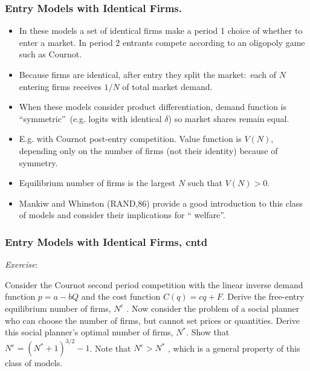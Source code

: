 \begin{frame}%

\frametitle{Entry Models with Identical Firms.}

\begin{itemize}
\item In these models a set of identical firms make a period 1 choice of
whether to enter a market. In period 2 entrants compete according to an
oligopoly game such as Cournot.

\item Because firms are identical, after entry they split the market:\ each
of $N$ entering firms receives $1/N$ of total market demand.

\item When these models consider product differentiation, demand function is
\textquotedblleft symmetric\textquotedblright\ (e.g. logits with identical $%
\delta $) so market shares remain equal.

\item E.g. with Cournot post-entry competition. Value function is $V(N)$,
depending only on the number of firms (not their identity) because of
symmetry.

\item Equilibrium number of firms is the largest $N$ such that $V(N)>0$.

\item Mankiw and Whinston (RAND,86) provide a good introduction to this
class of models and consider their implications for \textquotedblleft
welfare\textquotedblright .
\end{itemize}

\end{frame}%

\begin{frame}%

\frametitle{Entry Models with Identical Firms, cntd}

\textit{Exercise}:

Consider the Cournot second period competition with the linear inverse
demand function $p=a-bQ$ and the cost function $C(q)=cq+F$. Derive the
free-entry equilibrium number of firms, $N^{e}$ . Now consider the problem
of a social planner who can choose the number of firms, but cannot set
prices or quantities. Derive this social planner's optimal number of firms, $%
N^{\ast }$. Show that $N^{e}=(N^{\ast }+1)^{3/2}-1$. Note that $%
N^{e}>N^{\ast }$ , which is a general property of this class of models.

\end{frame}%

